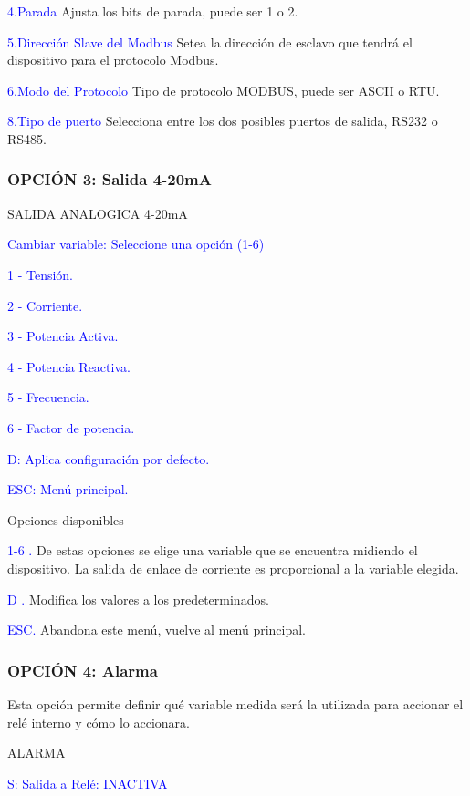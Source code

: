 \textcolor{blue}{4.Parada}
Ajusta los bits de parada, puede ser 1 o 2.

\textcolor{blue}{5.Dirección Slave del Modbus}
Setea la dirección de esclavo que tendrá el dispositivo para el protocolo Modbus.

\textcolor{blue}{6.Modo del Protocolo}
Tipo de protocolo MODBUS, puede ser ASCII o RTU.

\textcolor{blue}{8.Tipo de puerto}
Selecciona entre los dos posibles puertos de salida, RS232 o RS485.


\subsubsection{OPCIÓN 3: Salida 4-20mA}
\textcolor{mygreen}{SALIDA ANALOGICA 4-20mA}

\textcolor{blue}{Cambiar variable: Seleccione una opción (1-6)}

\textcolor{blue}{1 - Tensión.}

\textcolor{blue}{2 - Corriente.}

\textcolor{blue}{3 - Potencia Activa.}

\textcolor{blue}{4 - Potencia Reactiva.}

\textcolor{blue}{5 - Frecuencia.}

\textcolor{blue}{6 - Factor de potencia.}

\textcolor{blue}{D: Aplica configuración por defecto.}

\textcolor{blue}{ESC: Menú principal.}


 

Opciones disponibles

\textcolor{blue}{1-6 .}
De estas opciones se elige una variable que se encuentra midiendo el dispositivo. La salida de enlace de corriente es proporcional a la variable elegida.

\textcolor{blue}{D .}
Modifica los valores a los predeterminados.

\textcolor{blue}{ESC.}
Abandona este menú, vuelve al menú principal.

\subsubsection{OPCIÓN 4: Alarma}

Esta opción permite definir qué variable medida será la utilizada para accionar el relé interno y cómo lo accionara.

\textcolor{mygreen}{ALARMA}

\textcolor{blue}{S: Salida a Relé: INACTIVA}

